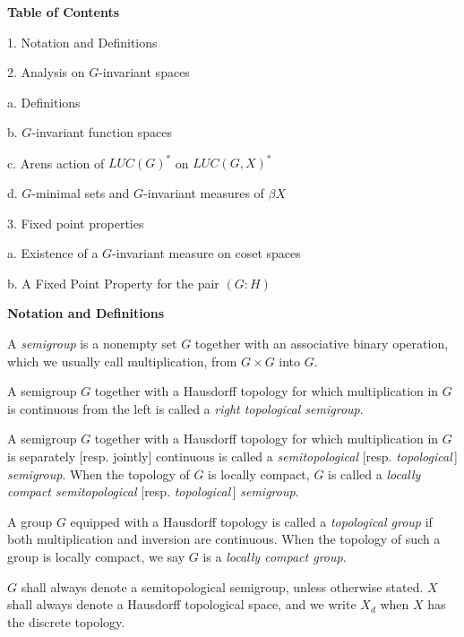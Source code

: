 \documentclass[landscape]{slides}
\begin{document}
\begin{slide}
{\large\textbf{Table of Contents}}
\begin{list}{}{ pt}
\item[1.] Notation and Definitions
\item[2.] Analysis on $G$-invariant spaces
\begin{list}{}{ pt  pt}
\item[a.] Definitions
\item[b.] $G$-invariant function spaces
\item[c.] Arens action of $LUC(G)^*$ on $LUC(G,X)^*$
\item[d.] $G$-minimal sets and $G$-invariant measures of $\beta X$
\end{list}
\item[3.] Fixed point properties
\begin{list}{}{ pt  pt}
\item[a.] Existence of a $G$-invariant measure on coset spaces
\item[b.] A Fixed Point Property for the pair $(G:H)$
\end{list}
\end{list}
\end{slide}

\begin{slide}
{\large\bf{Notation and Definitions}}

{\small
A {\it semigroup} is a nonempty set $G$ together with an associative binary operation,
which we usually call multiplication, from $G\times G$ into $G$.

A semigroup $G$ together with a Hausdorff topology for which
multiplication in $G$ is continuous from the left is called a 
{\it right topological semigroup}.

A semigroup $G$ together with a Hausdorff topology for which
multiplication in $G$ is separately [resp. jointly] continuous is called a
{\it semitopological} [resp. {\it topological}\,] {\it semigroup}.
When the topology of $G$ is locally compact, $G$ is called a {\it locally compact semitopological}
[resp. {\it topological}\,] {\it semigroup}.

A group $G$ equipped with a Hausdorff topology is called a {\it topological group}
if both multiplication and inversion are continuous.  When the topology of such a group is
locally compact, we say $G$ is a {\it locally compact group}.

$G$ shall always denote a semitopological semigroup, unless otherwise stated.
$X$ shall always denote a Hausdorff topological space, and we write $X_d$ when $X$ has the discrete topology.}
\end{slide}
\end{document}
